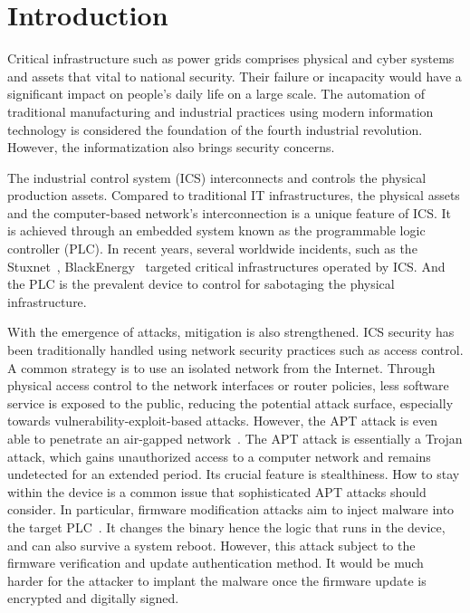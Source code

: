 \section{Introduction}
\label{sec:implant-introduction}

Critical infrastructure such as power grids comprises physical and cyber systems and assets that vital to national security. Their failure or incapacity would have a significant impact on people's daily life on a large scale. The automation of traditional manufacturing and industrial practices using modern information technology is considered the foundation of the fourth industrial revolution.  However, the informatization also brings security concerns. 

The industrial control system (ICS) interconnects and controls the physical production assets.  Compared to traditional IT infrastructures, the physical assets and the computer-based network's interconnection is a unique feature of ICS. It is achieved through an embedded system known as the programmable logic controller (PLC). In recent years, several worldwide incidents, such as the Stuxnet~\cite{langner2011stuxnet}, BlackEnergy~\cite{cherepanov2016blackenergy} targeted critical infrastructures operated by ICS. And the PLC is the prevalent device to control for sabotaging the physical infrastructure.


With the emergence of attacks, mitigation is also strengthened. ICS security has been traditionally handled using network security practices such as access control. A common strategy is to use an isolated network from the Internet. Through physical access control to the network interfaces or router policies, less software service is exposed to the public, reducing the potential attack surface, especially towards vulnerability-exploit-based attacks. However, the APT attack is even able to penetrate an air-gapped network~\cite{langner2011stuxnet}. The APT attack is essentially a Trojan attack, which gains unauthorized access to a computer network and remains undetected for an extended period. Its crucial feature is stealthiness. How to stay within the device is a common issue that sophisticated APT attacks should consider. In particular, firmware modification attacks aim to inject malware into the target PLC~\cite{garcia2017hey}.  It changes the binary hence the logic that runs in the device, and can also survive a system reboot. However, this attack subject to the firmware verification and update authentication method. It would be much harder for the attacker to implant the malware once the firmware update is encrypted and digitally signed. 

